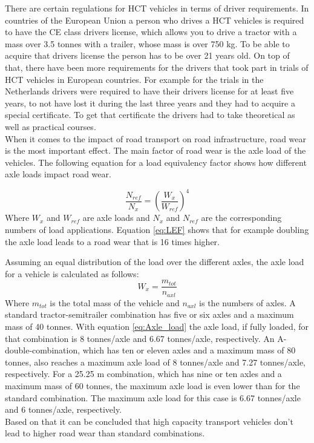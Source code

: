 \documentclass[ExampleMasters.tex]{subfiles}
\begin{document}
There are certain regulations for \gls{HCT} vehicles in terms of driver requirements. In countries of the European Union a person who drives a \gls{HCT} vehicles is required to have the CE class drivers license, which allows you to drive a tractor with a  mass over 3.5 tonnes with a trailer, whose mass is over 750 kg. To be able to acquire that drivers license the person has to be over 21 years old. \cite{EU_driving_licenses} 
On top of that, there have been more requirements for the drivers that took part in trials of \gls{HCT} vehicles in European countries. For example for the trials in the Netherlands drivers were required to have their drivers license for at least five years, to not have lost it during the last three years and they had to acquire a special certificate. To get that certificate the drivers had to take theoretical as well as practical courses.
\cite{HCT_vehicles_test_netherlands} \\

When it comes to the impact of road transport on road infrastructure, road wear is the most important effect. The main factor of road wear is the axle load of the vehicles. The following equation for a load equivalency factor shows how different axle loads impact road wear.   

\begin{equation}
\frac{N_{ref}}{N_x}=\left(\frac{W_x}{W_{ref}}\right)^4
\label{eq:LEF}
\end{equation}
Where $W_x$ and $W_{ref}$ are axle loads and $N_x$ and $N_{ref}$ are the corresponding numbers of load applications.\cite{road_wear} Equation \eqref{eq:LEF} shows that for example doubling the axle load leads to a road wear that is 16 times higher.

Assuming an equal distribution of the load over the different axles, the axle load for a vehicle is calculated as follows:\\
\begin{equation}
W_x=\frac{m_{tot}}{n_{axl}}
\label{eq:Axle_load}
\end{equation}
Where $m_{tot}$ is the total mass of the vehicle and $n_{axl}$ is the numbers of axles.
A standard tractor-semitrailer combination has five or six axles and a maximum mass of 40 tonnes.
With equation \eqref{eq:Axle_load} the axle load, if fully loaded, for that combination is 8 tonnes/axle and 6.67 tonnes/axle, respectively.
An A-double-combination, which has ten or eleven axles and a maximum mass of 80 tonnes, also reaches a maximum axle  load of 8 tonnes/axle and 7.27 tonnes/axle, respectively.
For a 25.25 m combination, which has nine or ten axles and a maximum mass of 60 tonnes, the maximum axle load is even lower than for the standard combination. The maximum axle load for this case is 6.67 tonnes/axle and 6 tonnes/axle, respectively.
\\Based on that it can be concluded that high capacity transport vehicles don't lead to higher road wear than standard combinations.
\end{document}
